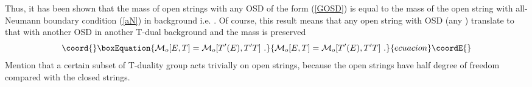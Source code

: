 \documentclass[a4paper,12pt]{article}
\def \cM{{\cal M}}
\def \1{{\bf 1}}
\begin{document}
Thus, it has been shown that 
the mass of open strings with any OSD of the form 
(\ref{GOSD}) is equal to the mass of 
the open string with all-Neumann boundary condition 
(\ref{aN}) in background \coordHE{} i.e. 
\myHighlight{$\cM_o^{-1}[E,T]=\cM_o^{-1}[T^{-1}E,\1]$}\coordHE{}. 
Of course, this result means that any 
open string with OSD \coordHE{} (any \coordHE{}) 
translate to that with another OSD \coordHE{} 
in another T-dual background \coordHE{} and the mass is preserved
\begin{equation}\coord{}\boxEquation{
 \cM_o[E,T]=\cM_o[T'(E),T'T]\ . \label{proof}
}{
 \cM_o[E,T]=\cM_o[T'(E),T'T]\ . }{ecuacion}\coordE{}\end{equation}
Mention that a certain subset of T-duality group acts trivially 
on open strings, because the open strings have 
half degree of freedom compared with the closed strings. 
\end{document}
